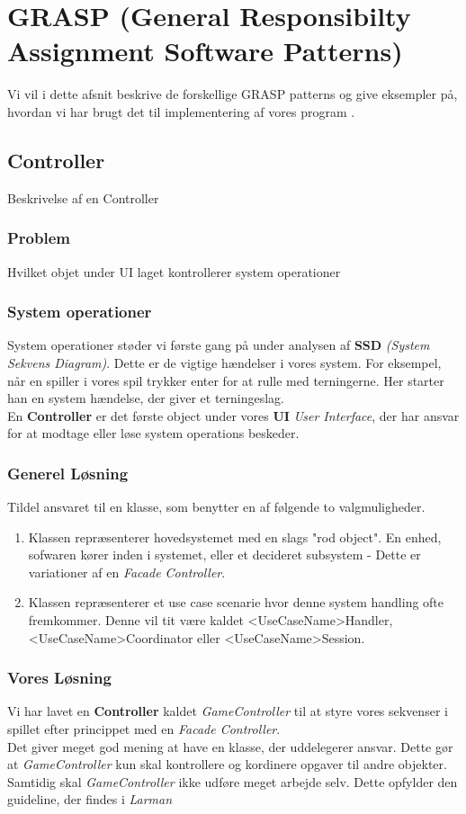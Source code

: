 \section{GRASP (General Responsibilty Assignment Software Patterns)}
Vi vil i dette afsnit beskrive de forskellige GRASP patterns og give eksempler på, hvordan vi har brugt det til implementering af vores program \cite{Larman}.
\subsection{Controller}
Beskrivelse af en Controller
\subsubsection{Problem}
Hvilket objet under UI laget kontrollerer system operationer
\subsubsection{System operationer}
System operationer støder vi første gang på under analysen af \textbf{SSD} \textit{(System Sekvens Diagram)}. Dette er de vigtige hændelser i vores system.
For eksempel, når en spiller i vores spil trykker enter for at rulle med terningerne. Her starter han en system hændelse, der giver et terningeslag.
\\
En \textbf{Controller} er det første object under vores \textbf{UI} \textit{User Interface}, der har ansvar for at modtage eller løse system operations beskeder.
\subsubsection{Generel Løsning}
Tildel ansvaret til en klasse, som benytter en af følgende to valgmuligheder.
\begin{enumerate}
\item Klassen repræsenterer hovedsystemet med en slags "rod object". En enhed, sofwaren kører inden i systemet, eller et decideret subsystem - Dette er variationer af en \textit{Facade Controller}.
\item Klassen repræsenterer et use case scenarie hvor denne system handling ofte fremkommer. Denne vil tit være kaldet <UseCaseName>Handler, <UseCaseName>Coordinator eller <UseCaseName>Session.
\end{enumerate}
\subsubsection{Vores Løsning}
Vi har lavet en \textbf{Controller} kaldet \textit{GameController} til at styre vores sekvenser i spillet efter princippet med en \textit{Facade Controller}. 
\\
Det giver meget god mening at have en klasse, der uddelegerer ansvar. Dette gør at \textit{GameController} kun skal kontrollere og kordinere opgaver til andre objekter. Samtidig skal \textit{GameController} ikke udføre meget arbejde selv. Dette opfylder den guideline, der findes i \textit{Larman}
